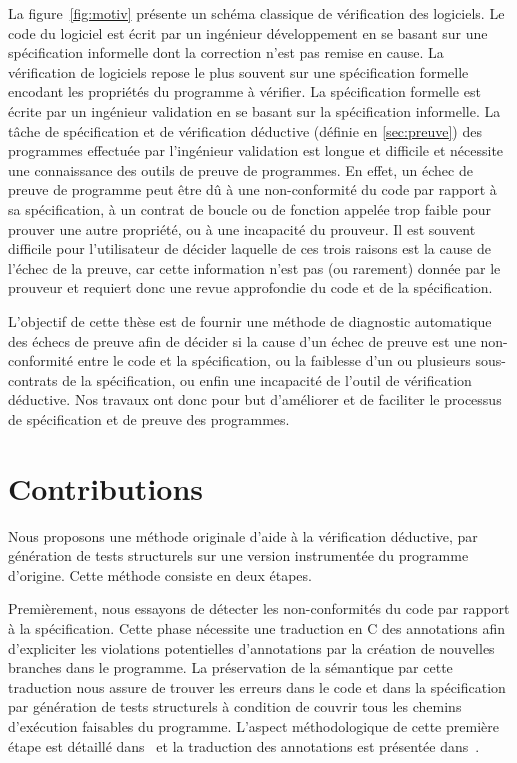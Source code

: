 La figure~\ref{fig:motiv} présente un schéma classique de vérification des
logiciels.
Le code du logiciel est écrit par un ingénieur développement en se basant sur
une spécification informelle dont la correction n'est pas remise en cause.
La vérification de logiciels repose le plus souvent sur une spécification
formelle encodant les propriétés du programme à vérifier.
La spécification formelle est écrite par un ingénieur validation en se basant
sur la spécification informelle.
La tâche de spécification et de vérification déductive (définie en
\ref{sec:preuve}) des programmes effectuée par l'ingénieur validation est longue
et difficile et nécessite une connaissance des outils de preuve de programmes.
En effet, un échec de preuve de programme peut être dû à une non-conformité du
code par rapport à sa spécification, à un contrat de boucle ou de fonction
appelée  trop faible pour prouver une autre propriété, ou à une incapacité du
prouveur.
Il est souvent difficile pour l'utilisateur de décider laquelle de ces trois
raisons est la cause de l'échec de la preuve, car cette information n'est pas
(ou rarement) donnée par le prouveur et requiert donc une revue approfondie
du code et de la spécification.

L'objectif de cette thèse est de fournir une méthode de diagnostic automatique
des échecs de preuve afin de décider si la cause d'un échec de preuve est une
non-conformité entre le code et la spécification, ou la faiblesse d'un ou
plusieurs sous-contrats de la spécification, ou enfin une incapacité de l'outil
de vérification déductive.
Nos travaux ont donc pour but d'améliorer et de faciliter le processus de
spécification et de preuve des programmes.


\section{Contributions}
\label{sec:contrib}


Nous proposons une méthode originale d'aide à la vérification déductive, par
génération de tests structurels sur une version instrumentée du programme
d'origine.
Cette méthode consiste en deux étapes.

Premièrement, nous essayons de détecter les non-conformités du code par
rapport à la spécification.
Cette phase nécessite une traduction en C des annotations \acsl afin
d'expliciter les violations potentielles d'annotations par la création de
nouvelles branches dans le programme.
La préservation de la sémantique par cette traduction nous assure de trouver
les erreurs dans le code et dans la spécification par génération de tests
structurels à condition de couvrir tous les chemins d'exécution faisables du
programme.
L'aspect méthodologique de cette première étape est détaillé
dans~\cite{Petiot/TAP14} et la traduction des annotations est présentée
dans~\cite{Petiot/SCAM14}.

